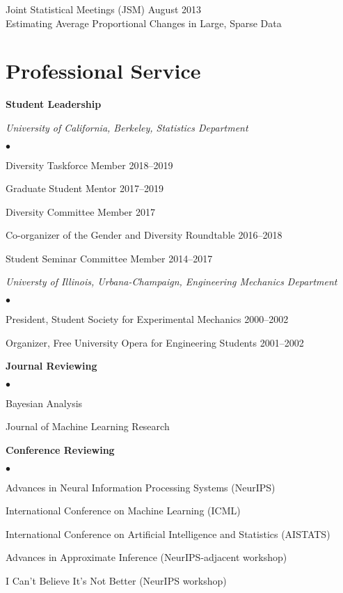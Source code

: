 \documentclass[margin,line]{res}
\newenvironment{list2}{
  \begin{list}{$\bullet$}{%
      \setlength{\itemsep}{0in}
      \setlength{\parsep}{0in} \setlength{\parskip}{0in}
      \setlength{\topsep}{0in} \setlength{\partopsep}{0in}
      \setlength{\leftmargin}{0.2in}}}{\end{list}}
\begin{document}
\begin{resume}
Joint Statistical Meetings (JSM) \hfill August 2013\\
Estimating Average Proportional Changes in Large, Sparse Data


\section{\sc Professional Service}

\textbf{Student Leadership}

{\em University of California, Berkeley, Statistics Department}
\begin{list2}
    \item Diversity Taskforce Member \hfill 2018--2019
    \item Graduate Student Mentor \hfill 2017--2019
    \item Diversity Committee Member  \hfill 2017
    \item Co-organizer of the Gender and Diversity Roundtable \hfill 2016--2018
    \item Student Seminar Committee Member \hfill 2014--2017
\end{list2}

{\em Universty of Illinois, Urbana-Champaign, Engineering Mechanics Department}
\begin{list2}
    \item President, Student Society for Experimental Mechanics \hfill 2000--2002
    \item Organizer, Free University Opera for Engineering Students \hfill 2001--2002
\end{list2}


\textbf{Journal Reviewing}
\begin{list2}
\item Bayesian Analysis
\item Journal of Machine Learning Research
\end{list2}

\textbf{Conference Reviewing}
\begin{list2}
\item Advances in Neural Information Processing Systems (NeurIPS)
\item International Conference on Machine Learning (ICML)
\item International Conference on Artificial Intelligence and Statistics (AISTATS)
\item Advances in Approximate Inference (NeurIPS-adjacent workshop)
\item I Can't Believe It's Not Better (NeurIPS workshop)
\end{list2}



\end{resume}
\end{document}
